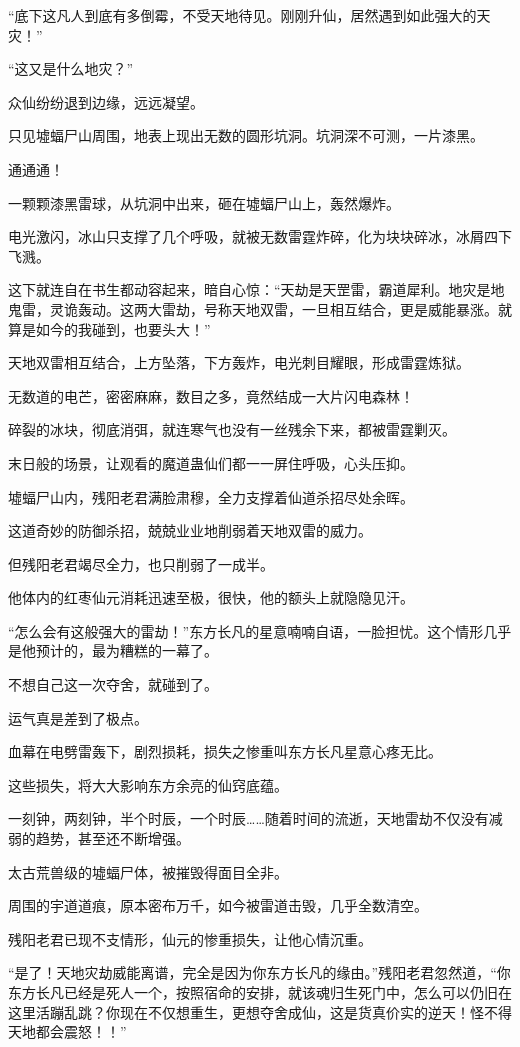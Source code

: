 \begin{this_body}
“底下这凡人到底有多倒霉，不受天地待见。刚刚升仙，居然遇到如此强大的天灾！”

“这又是什么地灾？”

众仙纷纷退到边缘，远远凝望。

只见墟蝠尸山周围，地表上现出无数的圆形坑洞。坑洞深不可测，一片漆黑。

通通通！

一颗颗漆黑雷球，从坑洞中出来，砸在墟蝠尸山上，轰然爆炸。

电光激闪，冰山只支撑了几个呼吸，就被无数雷霆炸碎，化为块块碎冰，冰屑四下飞溅。

这下就连自在书生都动容起来，暗自心惊：“天劫是天罡雷，霸道犀利。地灾是地鬼雷，灵诡轰动。这两大雷劫，号称天地双雷，一旦相互结合，更是威能暴涨。就算是如今的我碰到，也要头大！”

天地双雷相互结合，上方坠落，下方轰炸，电光刺目耀眼，形成雷霆炼狱。

无数道的电芒，密密麻麻，数目之多，竟然结成一大片闪电森林！

碎裂的冰块，彻底消弭，就连寒气也没有一丝残余下来，都被雷霆剿灭。

末日般的场景，让观看的魔道蛊仙们都一一屏住呼吸，心头压抑。

墟蝠尸山内，残阳老君满脸肃穆，全力支撑着仙道杀招尽处余晖。

这道奇妙的防御杀招，兢兢业业地削弱着天地双雷的威力。

但残阳老君竭尽全力，也只削弱了一成半。

他体内的红枣仙元消耗迅速至极，很快，他的额头上就隐隐见汗。

“怎么会有这般强大的雷劫！”东方长凡的星意喃喃自语，一脸担忧。这个情形几乎是他预计的，最为糟糕的一幕了。

不想自己这一次夺舍，就碰到了。

运气真是差到了极点。

血幕在电劈雷轰下，剧烈损耗，损失之惨重叫东方长凡星意心疼无比。

这些损失，将大大影响东方余亮的仙窍底蕴。

一刻钟，两刻钟，半个时辰，一个时辰……随着时间的流逝，天地雷劫不仅没有减弱的趋势，甚至还不断增强。

太古荒兽级的墟蝠尸体，被摧毁得面目全非。

周围的宇道道痕，原本密布万千，如今被雷道击毁，几乎全数清空。

残阳老君已现不支情形，仙元的惨重损失，让他心情沉重。

“是了！天地灾劫威能离谱，完全是因为你东方长凡的缘由。”残阳老君忽然道，“你东方长凡已经是死人一个，按照宿命的安排，就该魂归生死门中，怎么可以仍旧在这里活蹦乱跳？你现在不仅想重生，更想夺舍成仙，这是货真价实的逆天！怪不得天地都会震怒！！”


\end{this_body}
